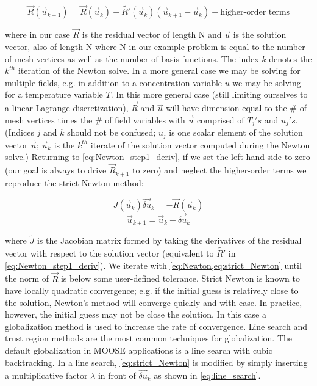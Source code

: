 \begin{equation}
  \vec{R}(\vec{u}_{k+1}) = \vec{R}(\vec{u}_k) + \tilde{R'}(\vec{u}_k)(\vec{u}_{k+1}-\vec{u}_k)+\text{higher-order terms}
  \label{eq:Newton_step1_deriv}
\end{equation}

where in our case $\vec{R}$ is the residual vector of length N and $\vec{u}$ is the solution vector, also of length N where N in our example problem is equal to the number of mesh vertices as well as the number of basis functions. The index $k$ denotes the $k^{th}$ iteration of the Newton solve. In a more general case we may be solving for multiple fields, e.g. in addition to a concentration variable $u$ we may be solving for a temperature variable $T$. In this more general case (still limiting ourselves to a linear Lagrange discretization), $\vec{R}$ and $\vec{u}$ will have dimension equal to the \# of mesh vertices times the \# of field variables with $\vec{u}$ comprised of $T_j's$ and $u_j's$. (Indices $j$ and $k$ should not be confused; $u_j$ is one scalar element of the solution vector $\vec{u}$; $\vec{u}_k$ is the $k^{th}$ iterate of the solution vector computed during the Newton solve.) Returning to \cref{eq:Newton_step1_deriv}, if we set the left-hand side to zero (our goal is always to drive $\vec{R}_{k+1}$ to zero) and neglect the higher-order terms we reproduce the strict Newton method:

\begin{equation}
  \tilde{J}(\vec{u}_k)\vec{\delta u}_k = -\vec{R}(\vec{u}_k)
  \label{eq:Newton}
\end{equation}
\begin{equation}
  \vec{u}_{k+1} = \vec{u}_k + \vec{\delta u}_k
  \label{eq:strict_Newton}
\end{equation}

where $\tilde{J}$ is the Jacobian matrix formed by taking the derivatives of the residual vector with respect to the solution vector (equivalent to $\tilde{R'}$ in \cref{eq:Newton_step1_deriv}).\cite{knoll2004jacobian}  We iterate with \cref{eq:Newton,eq:strict_Newton} until the norm of $\vec{R}$ is below some user-defined tolerance. Strict Newton is known to have locally quadratic convergence; e.g. if the initial guess is relatively close to the solution, Newton's method will converge quickly and with ease. \cite{dennis1996numerical} In practice, however, the initial guess may not be close the solution. In this case a globalization method is used to increase the rate of convergence. Line search and trust region methods are the most common techniques for globalization. The default globalization in MOOSE applications is a line search with cubic backtracking. In a line search, \cref{eq:strict_Newton} is modified by simply inserting a multiplicative factor $\lambda$ in front of $\vec{\delta u}_k$ as shown in \cref{eq:line_search}.

